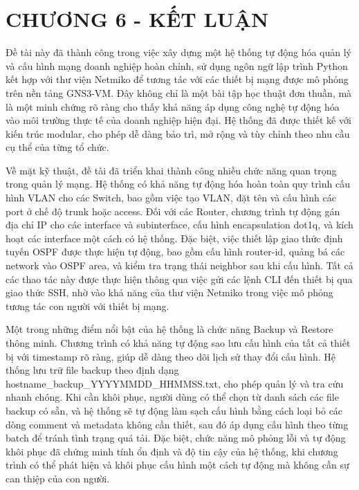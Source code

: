 \section*{CHƯƠNG 6 - KẾT LUẬN}
\setcounter{section}{6}
\setcounter{subsection}{0}
\setcounter{figure}{0}
\setcounter{table}{0}

Đề tài này đã thành công trong việc xây dựng một hệ thống tự động hóa quản lý và cấu hình mạng doanh nghiệp hoàn chỉnh, sử dụng ngôn ngữ lập trình Python kết hợp với thư viện Netmiko để tương tác với các thiết bị mạng được mô phỏng trên nền tảng GNS3-VM. Đây không chỉ là một bài tập học thuật đơn thuần, mà là một minh chứng rõ ràng cho thấy khả năng áp dụng công nghệ tự động hóa vào môi trường thực tế của doanh nghiệp hiện đại. Hệ thống đã được thiết kế với kiến trúc modular, cho phép dễ dàng bảo trì, mở rộng và tùy chỉnh theo nhu cầu cụ thể của từng tổ chức.

Về mặt kỹ thuật, đề tài đã triển khai thành công nhiều chức năng quan trọng trong quản lý mạng. Hệ thống có khả năng tự động hóa hoàn toàn quy trình cấu hình VLAN cho các Switch, bao gồm việc tạo VLAN, đặt tên và cấu hình các port ở chế độ trunk hoặc access. Đối với các Router, chương trình tự động gán địa chỉ IP cho các interface và subinterface, cấu hình encapsulation dot1q, và kích hoạt các interface một cách có hệ thống. Đặc biệt, việc thiết lập giao thức định tuyến OSPF được thực hiện tự động, bao gồm cấu hình router-id, quảng bá các network vào OSPF area, và kiểm tra trạng thái neighbor sau khi cấu hình. Tất cả các thao tác này được thực hiện thông qua việc gửi các lệnh CLI đến thiết bị qua giao thức SSH, nhờ vào khả năng của thư viện Netmiko trong việc mô phỏng tương tác con người với thiết bị mạng.

Một trong những điểm nổi bật của hệ thống là chức năng Backup và Restore thông minh. Chương trình có khả năng tự động sao lưu cấu hình của tất cả thiết bị với timestamp rõ ràng, giúp dễ dàng theo dõi lịch sử thay đổi cấu hình. Hệ thống lưu trữ file backup theo định dạng hostname\_backup\_YYYYMMDD\_HHMMSS.txt, cho phép quản lý và tra cứu nhanh chóng. Khi cần khôi phục, người dùng có thể chọn từ danh sách các file backup có sẵn, và hệ thống sẽ tự động làm sạch cấu hình bằng cách loại bỏ các dòng comment và metadata không cần thiết, sau đó áp dụng cấu hình theo từng batch để tránh tình trạng quá tải. Đặc biệt, chức năng mô phỏng lỗi và tự động khôi phục đã chứng minh tính ổn định và độ tin cậy của hệ thống, khi chương trình có thể phát hiện và khôi phục cấu hình một cách tự động mà không cần sự can thiệp của con người.

